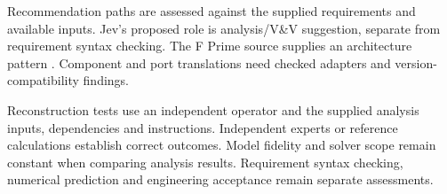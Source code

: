 Recommendation paths are assessed against the supplied requirements and available inputs. Jev's proposed role is analysis/V\&V suggestion, separate from requirement syntax checking. The F Prime source supplies an architecture pattern \citep{review-0853}. Component and port translations need checked adapters and version-compatibility findings.

Reconstruction tests use an independent operator and the supplied analysis inputs, dependencies and instructions. Independent experts or reference calculations establish correct outcomes. Model fidelity and solver scope remain constant when comparing analysis results. Requirement syntax checking, numerical prediction and engineering acceptance remain separate assessments.
